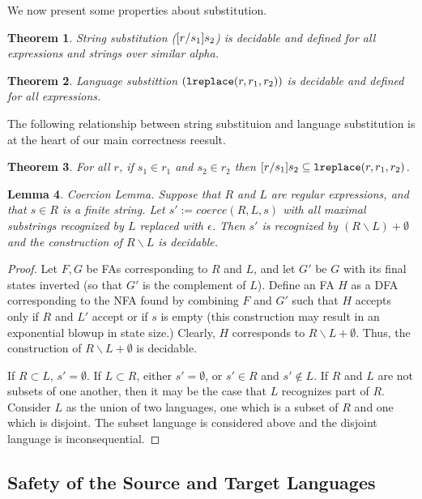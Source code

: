 \documentclass{acm_proc_article-sp}
\newtheorem{thm}{Theorem}
\newtheorem{lem}[thm]{Lemma}
\theoremstyle{definition}
\newcommand{\lsubst}[3]{{\tt lreplace}(#1,#2,#3)}
\begin{document}
We now present some properties about substitution.

\begin{thm}
  String substitution ($[r/s_1]s_2$) is decidable and defined for all expressions
  and strings over similar alpha.
\end{thm}

\begin{thm}
  Language substittion $(\lsubst{r}{r_1}{r_2})$ is decidable and defined for
  all expressions.
\end{thm}

The following relationship between string substituion and language substitution is at
the heart of our main correctness reesult.

\begin{thm}
  For all $r$, if $s_1 \in r_1$ and $s_2 \in r_2$ then 
  $\subst{r}{s_1}{s_2} \subseteq \lsubst{r}{r_1}{r_2}$.
\end{thm}

\begin{lem}{Coercion Lemma.} \label{thm:coercionalemma}
Suppose that $R$ and $L$ are regular expressions, and that $s \in R$ is a finite string.  Let $s' := coerce(R,L,s)$ with all maximal substrings recognized by $L$ replaced with $\epsilon$.  Then $s'$ is recognized by $(R \backslash L) + \emptyset$ and the construction of $R \backslash L$ is decidable.
\end{lem}
\begin{proof}
Let $F,G$ be FAs corresponding to $R$ and $L$, and let $G'$ be $G$ with its final states inverted (so that $G'$ is the complement of $L$).  Define an FA $H$ as a DFA corresponding to the NFA found by combining $F$ and $G'$ such that $H$ accepts only if $R$ and $L'$ accept or if $s$ is empty (this construction may result in an exponential blowup in state size.)  Clearly, $H$ corresponds to $R \backslash L + \emptyset$.  Thus, the construction of $R \backslash L + \emptyset$ is decidable.

If $R \subset L$, $s' = \emptyset$.  If $L \subset R$, either $s' = \emptyset$, or $s' \in R$ and $s' \not \in L$. If $R$ and $L$ are not subsets of one another, then it may be the case that $L$ recognizes part of $R$.  Consider $L$ as the union of two languages, one which is a subset of $R$ and one which is disjoint.  The subset language is considered above and the disjoint language is inconsequential.
\end{proof}


\subsection{Safety of the Source and Target Languages}
\end{document}
